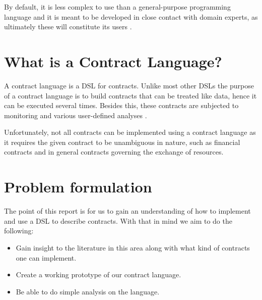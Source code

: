 \documentclass{ituthesis}
\begin{document}
By default, it is less complex to use than a general-purpose programming language and it is meant to be developed in close contact with domain experts, as ultimately these will constitute its users \cite{dsl}.

\section{What is a Contract Language?}
A contract language is a DSL for contracts. Unlike most other DSLs the purpose of a contract language is to build contracts that can be treated like data, hence it can be executed several times. Besides this, these contracts are subjected to monitoring and various user-defined analyses \cite{andersen2006compositional}.

Unfortunately, not all contracts can be implemented using a contract language as it requires the given contract to be unambiguous in nature, such as financial contracts and in general contracts governing the exchange of resources.


\section{Problem formulation}
The point of this report is for us to gain an understanding of how to implement and use a DSL to describe contracts. With that in mind we aim to do the following:

\begin{itemize}
    \item Gain insight to the literature in this area along with what kind of contracts one can implement.
    \item Create a working prototype of our contract language.
    \item Be able to do simple analysis on the language.
\end{itemize}
\end{document}
